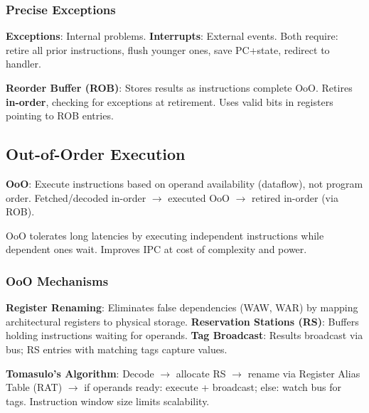 \subsubsection{Precise Exceptions}

\begin{definition}
	\textbf{Exceptions}: Internal problems. \textbf{Interrupts}: External events. Both require: retire all prior instructions, flush younger ones, save PC+state, redirect to handler.
\end{definition}

\begin{definition}
	\textbf{Reorder Buffer (ROB)}: Stores results as instructions complete OoO. Retires \textbf{in-order}, checking for exceptions at retirement. Uses valid bits in registers pointing to ROB entries.
\end{definition}

\subsection{Out-of-Order Execution}

\begin{definition}
	\textbf{OoO}: Execute instructions based on operand availability (dataflow), not program order. Fetched/decoded in-order $\to$ executed OoO $\to$ retired in-order (via ROB).
\end{definition}

\begin{remark}
	OoO tolerates long latencies by executing independent instructions while dependent ones wait. Improves IPC at cost of complexity and power.
\end{remark}

\subsubsection{OoO Mechanisms}

\begin{definition}
	\textbf{Register Renaming}: Eliminates false dependencies (WAW, WAR) by mapping architectural registers to physical storage.
	\textbf{Reservation Stations (RS)}: Buffers holding instructions waiting for operands.
	\textbf{Tag Broadcast}: Results broadcast via bus; RS entries with matching tags capture values.
\end{definition}

\begin{definition}
	\textbf{Tomasulo's Algorithm}: Decode $\to$ allocate RS $\to$ rename via Register Alias Table (RAT) $\to$ if operands ready: execute + broadcast; else: watch bus for tags. Instruction window size limits scalability.
\end{definition}

